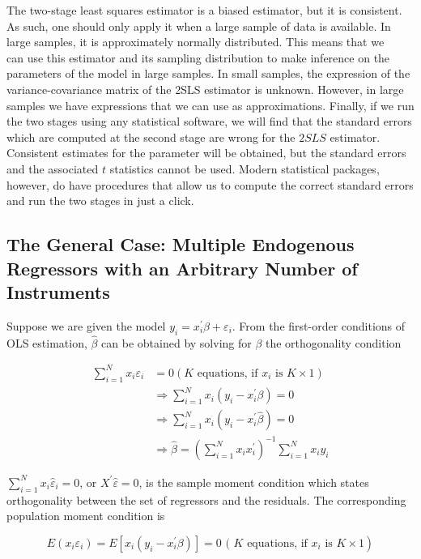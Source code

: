 The two-stage least squares estimator is a biased estimator, but it is consistent. As such, one should only apply it when a large sample of data is available. In large samples, it is approximately normally distributed. This means that we\\
can use this estimator and its sampling distribution to make inference on the parameters of the model in large samples. In small samples, the expression of the variance-covariance matrix of the 2SLS estimator is unknown. However, in large samples we have expressions that we can use as approximations. Finally, if we run the two stages using any statistical software, we will find that the standard errors which are computed at the second stage are wrong for the $2 S L S$ estimator. Consistent estimates for the parameter will be obtained, but the standard errors and the associated $t$ statistics cannot be used. Modern statistical packages, however, do have procedures that allow us to compute the correct standard errors and run the two stages in just a click.

\subsection{The General Case: Multiple Endogenous Regressors with an Arbitrary Number of Instruments}
Suppose we are given the model $y_{i}=x_{i}^{\prime} \beta+\varepsilon_{i}$. From the first-order conditions of OLS estimation, $\widehat{\beta}$ can be obtained by solving for $\beta$ the orthogonality condition

$$
\begin{aligned}
\sum_{i=1}^{N} x_{i} \varepsilon_{i} & =0\left(K \text { equations, if } x_{i} \text { is } K \times 1\right) \\
& \Longrightarrow \sum_{i=1}^{N} x_{i}\left(y_{i}-x_{i}^{\prime} \beta\right)=0 \\
& \Longrightarrow \sum_{i=1}^{N} x_{i}\left(y_{i}-x_{i}^{\prime} \widehat{\beta}\right)=0 \\
& \Longrightarrow \widehat{\beta}=\left(\sum_{i=1}^{N} x_{i} x_{i}^{\prime}\right)^{-1} \sum_{i=1}^{N} x_{i} y_{i}
\end{aligned}
$$

$\sum_{i=1}^{N} x_{i} \widehat{\varepsilon}_{i}=0$, or $X^{\prime} \widehat{\varepsilon}=0$, is the sample moment condition which states orthogonality between the set of regressors and the residuals. The corresponding population moment condition is

$$
\left.E\left(x_{i} \varepsilon_{i}\right)=E\left[x_{i}\left(y_{i}-x_{i}^{\prime} \beta\right)\right]=0 \text { ( } K \text { equations, if } x_{i} \text { is } K \times 1\right)
$$

